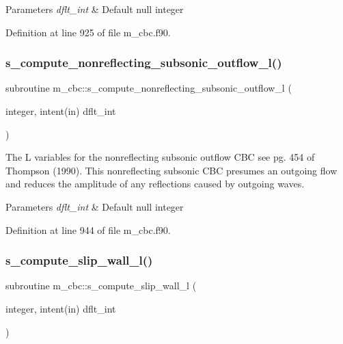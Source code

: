 \begin{DoxyParams}{Parameters}
{\em dflt\+\_\+int} & Default null integer \\
\hline
\end{DoxyParams}


Definition at line 925 of file m\+\_\+cbc.\+f90.

\mbox{\label{namespacem__cbc_af0664437857269683e572ec7b5e3b4b7}} 
\subsubsection{\texorpdfstring{s\+\_\+compute\+\_\+nonreflecting\+\_\+subsonic\+\_\+outflow\+\_\+l()}{s\_compute\_nonreflecting\_subsonic\_outflow\_l()}}
{\footnotesize\ttfamily subroutine m\+\_\+cbc\+::s\+\_\+compute\+\_\+nonreflecting\+\_\+subsonic\+\_\+outflow\+\_\+l (\begin{DoxyParamCaption}\item[{integer, intent(in)}]{dflt\+\_\+int }\end{DoxyParamCaption})}



The L variables for the nonreflecting subsonic outflow C\+BC see pg. 454 of Thompson (1990). This nonreflecting subsonic C\+BC presumes an outgoing flow and reduces the amplitude of any reflections caused by outgoing waves. 


\begin{DoxyParams}{Parameters}
{\em dflt\+\_\+int} & Default null integer \\
\hline
\end{DoxyParams}


Definition at line 944 of file m\+\_\+cbc.\+f90.

\mbox{\label{namespacem__cbc_ad51ac21554842928259732d09a7eaf51}} 
\subsubsection{\texorpdfstring{s\+\_\+compute\+\_\+slip\+\_\+wall\+\_\+l()}{s\_compute\_slip\_wall\_l()}}
{\footnotesize\ttfamily subroutine m\+\_\+cbc\+::s\+\_\+compute\+\_\+slip\+\_\+wall\+\_\+l (\begin{DoxyParamCaption}\item[{integer, intent(in)}]{dflt\+\_\+int }\end{DoxyParamCaption})}



